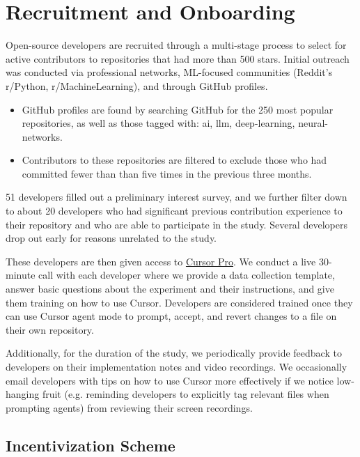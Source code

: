 \documentclass{article}
\begin{document}


\section{Recruitment and Onboarding}
\label{sec:RecruitmentAndOnboarding}

Open-source developers are recruited through a multi-stage process to select for active contributors to repositories that had more than 500 stars. Initial outreach was conducted via professional networks, ML-focused communities (Reddit’s r/Python, r/MachineLearning), and through GitHub profiles.
\begin{itemize}
    \item GitHub profiles are found by searching GitHub for the 250 most popular repositories, as well as those tagged with: ai, llm, deep-learning, neural-networks. 
    \item Contributors to these repositories are filtered to exclude those who had committed fewer than than five times in the previous three months.
\end{itemize}

51 developers filled out a preliminary interest survey, and we further filter down to about 20 developers who had significant previous contribution experience to their repository and who are able to participate in the study. Several developers drop out early for reasons unrelated to the study.

These developers are then given access to \href{https://cursor.com}{Cursor Pro}. We conduct a live 30-minute call with each developer where we provide a data collection template, answer basic questions about the experiment and their instructions, and give them training on how to use Cursor. Developers are considered trained once they can use Cursor agent mode to prompt, accept, and revert changes to a file on their own repository.

Additionally, for the duration of the study, we periodically provide feedback to developers on their implementation notes and video recordings. We occasionally email developers with tips on how to use Cursor more effectively if we notice low-hanging fruit (e.g. reminding developers to explicitly tag relevant files when prompting agents) from reviewing their screen recordings.

\subsection{Incentivization Scheme}
\label{sec:incentivization}
\end{document}
